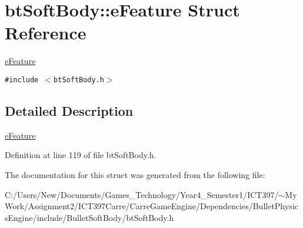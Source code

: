 \hypertarget{structbt_soft_body_1_1e_feature}{
\section{btSoftBody::eFeature Struct Reference}
\label{structbt_soft_body_1_1e_feature}
}
\hyperlink{structbt_soft_body_1_1e_feature}{eFeature}  


{\tt \#include $<$btSoftBody.h$>$}



\subsection{Detailed Description}
\hyperlink{structbt_soft_body_1_1e_feature}{eFeature} 

Definition at line 119 of file btSoftBody.h.

The documentation for this struct was generated from the following file:\begin{CompactItemize}
\item 
C:/Users/New/Documents/Games\_\-Technology/Year4\_\-Semester1/ICT397/$\sim$My Work/Assignment2/ICT397Carre/CarreGameEngine/Dependencies/BulletPhysicsEngine/include/BulletSoftBody/btSoftBody.h\end{CompactItemize}
